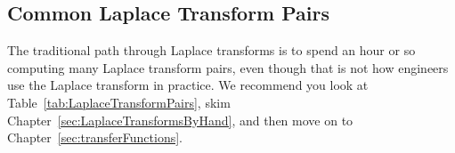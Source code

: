 
\subsection{Common Laplace Transform Pairs}


The traditional path through Laplace transforms is to spend an hour or so computing many Laplace transform pairs, even though that is not how engineers use the Laplace transform in practice. We recommend you look at Table~\ref{tab:LaplaceTransformPairs}, skim Chapter~\ref{sec:LaplaceTransformsByHand}, and then move on to Chapter~\ref{sec:transferFunctions}. 


